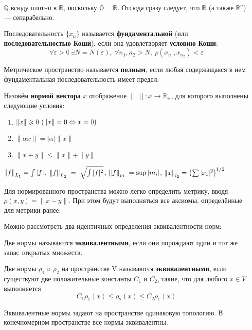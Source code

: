 \documentclass[12pt]{article}
\begin{document}
		\example $\mathbb{Q}$ всюду плотно в $\mathbb{R}$, поскольку $\overline{\mathbb{Q}} = \mathbb{R}$.
		Отсюда сразу следует, что $\mathbb{R}$ (а также $\mathbb{R}^n$) --- сепарабельно.

		\begin{defi}
			Последовательность $\{x_n\}$ называется \textbf{фундаментальной} (или \textbf{последовательностью Коши}), если она 
			удовлетворяет \textbf{условию Коши}:
			$$\forall \varepsilon > 0 ~\exists N = N(\varepsilon),~ \forall n_1, n_2 > N,~ \rho(x_{n_1}, x_{n_2}) < \varepsilon$$
		\end{defi}

		\begin{defi}
			Метрическое пространство называется \textbf{полным}, если любая содержащаяся в нем фундаментальная последовательность имеет 
			предел.
		\end{defi}

		\begin{defi}
			Назовём \textbf{нормой вектора} $x$ отображение $\|.\| : x \rightarrow \mathbb{R_+}$, для которого выполнены следующие условия:
			\begin{enumerate}
				\item $\|x\| \geqslant 0 ~(\|x\| = 0 \Leftrightarrow x = 0)$
				\item $\|\alpha x\| = |\alpha| \|x\|$
				\item $\|x + y\| \leq \|x\| + \|y\|$
			\end{enumerate}
		\end{defi}
	
		\example $\left\| f \right\|_{L_1} = \int {|f|}$, $\left\| f \right\|_{L_2} ~=~ \sqrt{\int {|f|^2}}$,  $\left\| f \right\|_{m} ~= \sup {|m_i|}$, $\left\| x \right\|_{l_2} = \left(\sum{|x_i|^2}\right)^{1/2}$ 
	
		Для нормированного пространства можно легко определить метрику, вводя $\rho(x,y) = \|x-y\|$. При этом будут выполняться все аксиомы,
		определённые для метрики ранее.
	
		Можно рассмотреть два идентичных определения эквивалентности норм:
	
		\begin{defi}
			Две нормы называются \textbf{эквивалентными}, если они порождают один и тот же запас открытых множеств.
		\end{defi}
	
		\begin{defi}
			Две нормы $\rho_1$ и $\rho_2$ на пространстве V называются \textbf{эквивалентными}, если существуют две положительные константы 
			$C_1$ и $C_2$, такие, что для любого $x \in V$ выполняется 
			$$C_1 \rho_1(x) \leq \rho_2(x) \leq C_2 \rho_1(x)$$
		\end{defi}
		Эквивалентные нормы задают на пространстве одинаковую топологию. В конечномерном пространстве все нормы эквивалентны.
	
\end{document}
